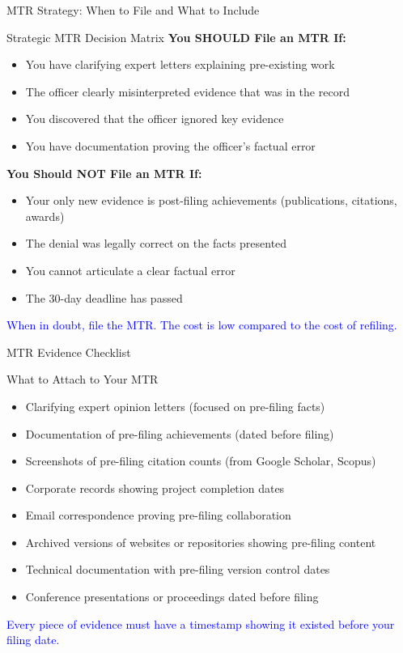 \documentclass[11pt]{beamer}
\begin{document}
	\begin{frame}{MTR Strategy: When to File and What to Include}
		\scriptsize
		\begin{block}{Strategic MTR Decision Matrix}
			\textbf{You SHOULD File an MTR If:}
			\begin{itemize}
				\item You have clarifying expert letters explaining pre-existing work
				\item The officer clearly misinterpreted evidence that was in the record
				\item You discovered that the officer ignored key evidence
				\item You have documentation proving the officer's factual error
			\end{itemize}
			\textbf{You Should NOT File an MTR If:}
			\begin{itemize}
				\item Your only new evidence is post-filing achievements (publications, citations, awards)
				\item The denial was legally correct on the facts presented
				\item You cannot articulate a clear factual error
				\item The 30-day deadline has passed
			\end{itemize}
			\textcolor{blue}{When in doubt, file the MTR. The cost is low compared to the cost of refiling.}
		\end{block}
	\end{frame}
	
	\begin{frame}{MTR Evidence Checklist}
		\scriptsize
		\begin{block}{What to Attach to Your MTR}
			\begin{itemize}
				\item [$\square$] Clarifying expert opinion letters (focused on pre-filing facts)
				\item [$\square$] Documentation of pre-filing achievements (dated before filing)
				\item [$\square$] Screenshots of pre-filing citation counts (from Google Scholar, Scopus)
				\item [$\square$] Corporate records showing project completion dates
				\item [$\square$] Email correspondence proving pre-filing collaboration
				\item [$\square$] Archived versions of websites or repositories showing pre-filing content
				\item [$\square$] Technical documentation with pre-filing version control dates
				\item [$\square$] Conference presentations or proceedings dated before filing
			\end{itemize}
			\textcolor{blue}{Every piece of evidence must have a timestamp showing it existed before your filing date.}
		\end{block}
	\end{frame}
	
\end{document}
